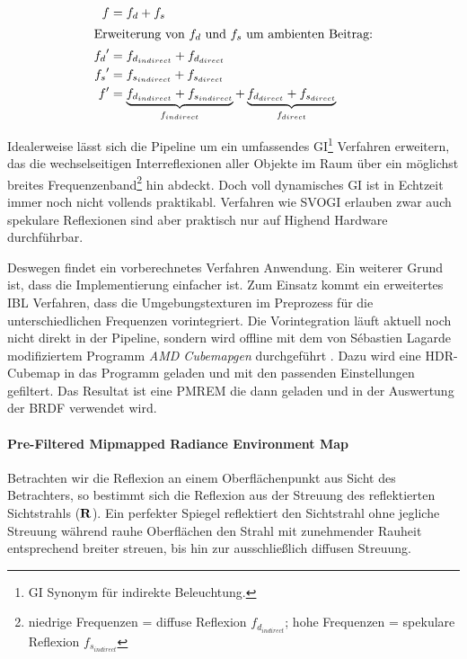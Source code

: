 \begin{align}
	\label{eq:brdf-indirect}
	f   &= f_d + f_s\\
	\intertext{Erweiterung von $f_d$ und $f_s$ um ambienten Beitrag:}
	{f_d}^{\prime} &= f_{d_{indirect}} + f_{d_{direct}}\\
	{f_s}^{\prime} &= f_{s_{indirect}} + f_{s_{direct}}\\
	\label{eq:brdf-indirect-dekonstruiert}
	f^{\prime}   &= \underbrace{f_{d_{indirect}} + f_{s_{indirect}}}_{f_{indirect}} + \underbrace{f_{d_{direct}} + f_{s_{direct}}}_{f_{direct}}
\end{align}

Idealerweise lässt sich die Pipeline um ein umfassendes \acf{GI}\footnote{\acl{GI} Synonym für indirekte Beleuchtung.} Verfahren erweitern, das die wechselseitigen Interreflexionen aller Objekte im Raum über ein möglichst breites Frequenzenband\footnote{niedrige Frequenzen = diffuse Reflexion $f_{d_{indirect}}$; hohe Frequenzen = spekulare Reflexion $f_{s_{indirect}}$} hin abdeckt. Doch voll dynamisches \ac{GI} ist in Echtzeit immer noch nicht vollends praktikabl. Verfahren wie \ac{SVOGI} \parencite{Lin2013} erlauben zwar auch spekulare Reflexionen sind aber praktisch nur auf Highend Hardware durchführbar.

Deswegen findet ein vorberechnetes Verfahren Anwendung. Ein weiterer Grund ist, dass die Implementierung einfacher ist. Zum Einsatz kommt ein erweitertes \acf{IBL} Verfahren, dass die Umgebungstexturen im Preprozess für die unterschiedlichen Frequenzen vorintegriert. Die Vorintegration läuft aktuell noch nicht direkt in der Pipeline, sondern wird offline mit dem von Sébastien Lagarde modifiziertem Programm \textit{AMD Cubemapgen} durchgeführt \parencite{Lagarde2012a}. Dazu wird eine HDR-Cubemap in das Programm geladen und mit den passenden Einstellungen gefiltert. Das Resultat ist eine \ac{PMREM} die dann geladen und in der Auswertung der \ac{BRDF} verwendet wird.

\paragraph{Pre-Filtered Mipmapped Radiance Environment Map} Betrachten wir die Reflexion an einem Oberflächenpunkt aus Sicht des Betrachters, so bestimmt sich die Reflexion aus der Streuung des reflektierten Sichtstrahls ($\mathbf R$). Ein perfekter Spiegel reflektiert den Sichtstrahl ohne jegliche Streuung während rauhe Oberflächen den Strahl mit zunehmender Rauheit entsprechend breiter streuen, bis hin zur ausschließlich diffusen Streuung.

